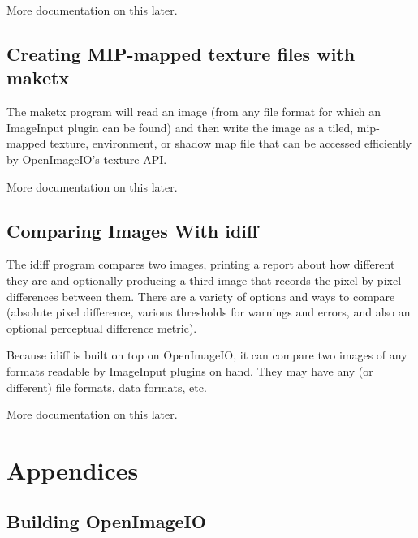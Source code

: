 \documentclass[11pt,letterpaper]{book}
\def\product{{\sffamily OpenImageIO}\xspace}
\def\ImageInput{{\codefont ImageInput}\xspace}
\begin{document}
More documentation on this later.

\chapter{Creating MIP-mapped texture files with {\cf maketx}}

The {\cf maketx} program will read an image (from any file format for
which an \ImageInput plugin can be found) and then write the image 
as a tiled, mip-mapped texture, environment, or shadow map file that
can be accessed efficiently by \product's texture API.

\medskip

More documentation on this later.


\chapter{Comparing Images With {\kw idiff}}

The {\cf idiff} program compares two images, printing a report about how
different they are and optionally producing a third image that records
the pixel-by-pixel differences between them.  There are a variety of
options and ways to compare (absolute pixel difference, various
thresholds for warnings and errors, and also an optional perceptual
difference metric).

Because {\cf idiff} is built on top on \product, it can compare two
images of any formats readable by \ImageInput plugins on hand.  They may
have any (or different) file formats, data formats, etc.

\medskip

More documentation on this later.

\part{Appendices}
\begin{appendix}

%
\chapter{Building OpenImageIO}

%

\end{appendix}

\backmatter

%

\printindex
\end{document}
